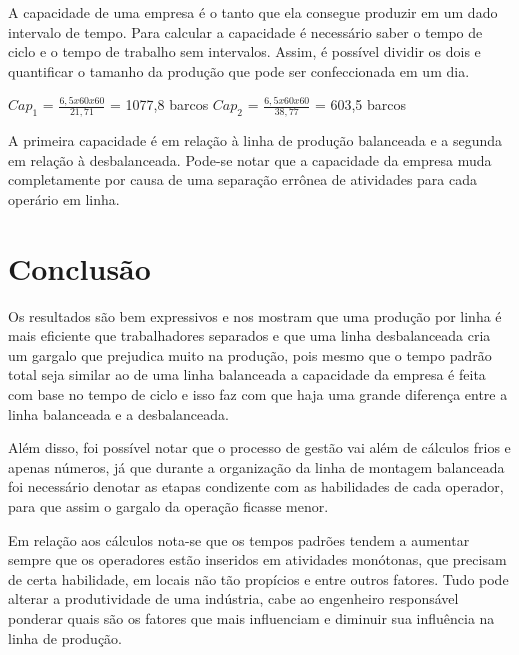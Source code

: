 \documentclass[
	12pt,				%
	oneside,			%
	a4paper,			%
	english,			%
	french,				%
	spanish,			%
	brazil,				%
	]{abntex2}
\begin{document}
A capacidade de uma empresa é o tanto que ela consegue produzir em um dado intervalo de tempo. Para calcular a capacidade é necessário saber o tempo de ciclo e o tempo de trabalho sem intervalos. Assim, é possível dividir os dois e quantificar o tamanho da produção que pode ser confeccionada em um dia.

$Cap_1$ = $\frac{6,5x60x60}{21,71}$ = 1077,8 barcos \quad	$Cap_2$ = $\frac{6,5x60x60}{38,77}$ = 603,5 barcos

A primeira capacidade é em relação à linha de produção balanceada e a segunda em relação à desbalanceada. Pode-se notar que a capacidade da empresa muda completamente por causa de uma separação errônea de atividades para cada operário em linha. 



\newpage
\section[Conclusão]{Conclusão}
\pagestyle{fancy}

Os resultados são bem expressivos e nos mostram que uma produção por linha é mais eficiente que trabalhadores separados e que uma linha desbalanceada cria um gargalo que prejudica muito na produção, pois mesmo que o tempo padrão total seja similar ao de uma linha balanceada a capacidade da empresa é feita com base no tempo de ciclo e isso faz com que haja uma grande diferença entre a linha balanceada e a desbalanceada.

Além disso, foi possível notar que o processo de gestão vai além de cálculos frios e apenas números, já que durante a organização da linha de montagem balanceada foi necessário denotar as etapas condizente com as habilidades de cada operador, para que assim o gargalo da operação ficasse menor.

Em relação aos cálculos nota-se que os tempos padrões tendem a aumentar sempre que os operadores estão inseridos em atividades monótonas, que precisam de certa habilidade, em locais não tão propícios e entre outros fatores. Tudo pode alterar a produtividade de uma indústria, cabe ao engenheiro responsável ponderar quais são os fatores que mais influenciam e diminuir sua influência na linha de produção.
%
%
\end{document}
